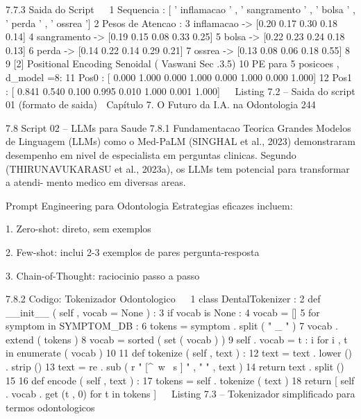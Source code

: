    7.7.3     Saida do Script
                                                                                                    
 1   Sequencia : [ ' inflamacao ' , ' sangramento ' , ' bolsa ' , ' perda ' , ' ossrea ']
 2   Pesos de Atencao :
 3       inflamacao -> [0.20 0.17 0.30 0.18 0.14]
 4      sangramento -> [0.19 0.15 0.08 0.33 0.25]
 5             bolsa -> [0.22 0.23 0.24 0.18 0.13]
 6             perda -> [0.14 0.22 0.14 0.29 0.21]
 7            ossrea -> [0.13 0.08 0.06 0.18 0.55]
 8
 9 [2] Positional Encoding Senoidal ( Vaswani Sec .3.5)
10   PE para 5 posicoes , d_model =8:
11     Pos0 : [ 0.000 1.000 0.000 1.000 0.000 1.000 0.000 1.000]
12     Pos1 : [ 0.841 0.540 0.100 0.995 0.010 1.000 0.001 1.000]
                                                                                                    
                        Listing 7.2 – Saida do script 01 (formato de saida)
     Capítulo 7. O Futuro da I.A. na Odontologia                                              244


     7.8       Script 02 – LLMs para Saude
     7.8.1      Fundamentacao Teorica
     Grandes Modelos de Linguagem (LLMs) como o Med-PaLM (SINGHAL et al., 2023)
     demonstraram desempenho em nivel de especialista em perguntas clinicas. Segundo
     (THIRUNAVUKARASU et al., 2023a), os LLMs tem potencial para transformar a atendi-
     mento medico em diversas areas.

         Prompt Engineering para Odontologia Estrategias eficazes incluem:

            1. Zero-shot: direto, sem exemplos

            2. Few-shot: inclui 2-3 exemplos de pares pergunta-resposta

            3. Chain-of-Thought: raciocinio passo a passo


     7.8.2      Codigo: Tokenizador Odontologico
                                                                                                   
 1 class DentalTokenizer :
 2     def __init__ ( self , vocab = None ) :
 3         if vocab is None :
 4              vocab = []
 5              for symptom in SYMPTOM_DB :
 6                   tokens = symptom . split ( " _ " )
 7                   vocab . extend ( tokens )
 8              vocab = sorted ( set ( vocab ) )
 9         self . vocab = { t : i for i , t in enumerate ( vocab ) }
10
11     def tokenize ( self , text ) :
12         text = text . lower () . strip ()
13         text = re . sub ( r " [^\ w \ s ] " , " " , text )
14         return text . split ()
15
16     def encode ( self , text ) :
17         tokens = self . tokenize ( text )
18         return [ self . vocab . get (t , 0) for t in tokens ]
                                                                                                   
                  Listing 7.3 – Tokenizador simplificado para termos odontologicos


